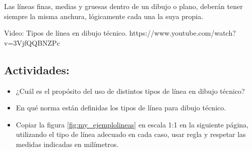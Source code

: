 \documentclass[../main]{subfiles}
\begin{document}
 Las líneas finas, medias y gruesas dentro de un dibujo o plano, deberán tener siempre la misma anchura, lógicamente cada una la suya propia.

\begin{tcolorbox}
Video: Tipos de línea en dibujo técnico.
\tcblower
{} https://www.youtube.com/watch?v=3VjfQQBNZPc
\end{tcolorbox}

\subsection*{Actividades:}
\begin{itemize}
\item ¿Cuál es el propósito del uso de distintos tipos de línea en dibujo técnico?
\item En qué norma están definidas los tipos de línea para dibujo técnico.
\item Copiar la figura \ref{fig:my_ejemplolineas} en escala 1:1 en la siguiente página, utilizando el tipo de línea adecuado en cada caso, usar regla y respetar las medidas indicadas en milímetros.
\end{itemize}
\end{document}
